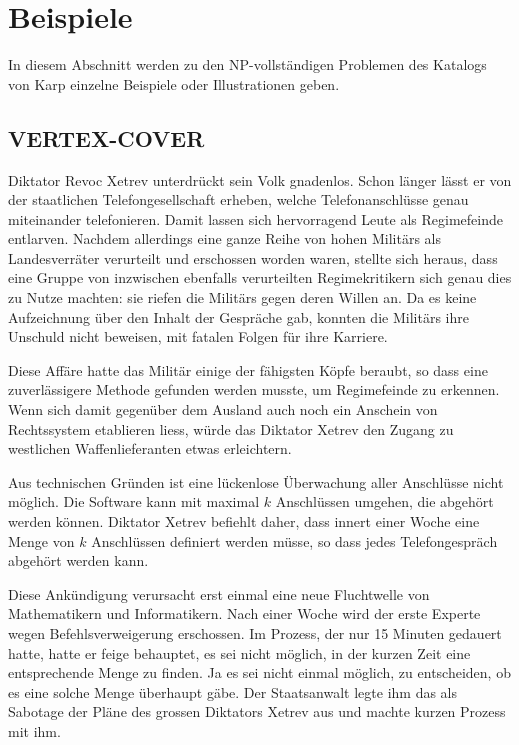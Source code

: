 %
%
%
\section{Beispiele}
In diesem Abschnitt werden zu den NP-vollständigen Problemen des
Katalogs von Karp einzelne Beispiele oder Illustrationen geben.
\subsection{VERTEX-COVER}
Diktator Revoc Xetrev unterdrückt sein Volk gnadenlos.
Schon länger lässt er von der staatlichen Telefongesellschaft
erheben, welche Telefonanschlüsse genau miteinander telefonieren.
Damit lassen sich hervorragend Leute als Regimefeinde entlarven.
Nachdem allerdings eine ganze Reihe von hohen Militärs als
Landesverräter verurteilt und erschossen worden waren,
stellte sich heraus, dass eine Gruppe von
inzwischen ebenfalls verurteilten Regimekritikern sich genau dies
zu Nutze machten: sie riefen die Militärs gegen deren Willen an.
Da es keine Aufzeichnung über den Inhalt der Gespräche gab, konnten
die Militärs ihre Unschuld nicht beweisen, mit fatalen Folgen für
ihre Karriere.

Diese Affäre hatte das Militär einige der fähigsten Köpfe beraubt,
so dass eine zuverlässigere Methode gefunden werden musste, um
Regimefeinde zu erkennen.
Wenn sich damit gegenüber dem Ausland auch noch ein Anschein von
Rechtssystem etablieren liess, würde das Diktator Xetrev den Zugang
zu westlichen Waffenlieferanten etwas erleichtern.

Aus technischen Gründen ist eine lückenlose Überwachung aller Anschlüsse
nicht möglich.
Die Software kann mit maximal $k$ Anschlüssen umgehen, die abgehört
werden können.
Diktator Xetrev befiehlt daher, dass innert einer Woche eine Menge
von $k$ Anschlüssen definiert werden müsse, so dass jedes
Telefongespräch abgehört werden kann.

Diese Ankündigung verursacht erst einmal eine neue Fluchtwelle von
Mathematikern und Informatikern.
Nach einer Woche wird der erste Experte wegen Befehlsverweigerung
erschossen.
Im Prozess, der nur 15 Minuten gedauert hatte, hatte er feige behauptet,
es sei nicht möglich, in der kurzen
Zeit eine entsprechende Menge zu finden. Ja es sei nicht einmal
möglich, zu entscheiden, ob es eine solche Menge überhaupt gäbe.
Der Staatsanwalt legte ihm das als Sabotage der Pläne des grossen
Diktators Xetrev aus und machte kurzen Prozess mit ihm.

